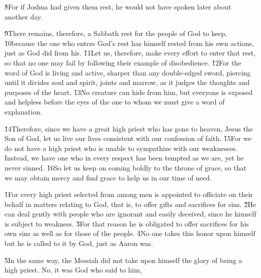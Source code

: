 \v{8}For if Joshua had given them rest, he would not have spoken later about another day.

\v{9}There remains, therefore, a Sabbath rest for the people of God to keep, \v{10}because the one who enters God's rest has himself rested from his own actions, just as God did from his. \v{11}Let us, therefore, make every effort to enter that rest, so that no one may fail by following their example of disobedience. \v{12}For the word of God is living and active, sharper than any double-edged sword, piercing until it divides soul and spirit, joints and marrow, as it judges the thoughts and purposes of the heart. \v{13}No creature can hide from him, but everyone is exposed and helpless before the eyes of the one to whom we must give a word of explanation.

\v{14}Therefore, since we have a great high priest who has gone to heaven, Jesus the Son of God, let us live our lives consistent with our confession of faith. \v{15}For we do not have a high priest who is unable to sympathize with our weaknesses. Instead, we have one who in every respect has been tempted as we are, yet he never sinned. \v{16}So let us keep on coming boldly to the throne of grace, so that we may obtain mercy and find grace to help us in our time of need.

\v{1}For every high priest selected from among men is appointed to officiate on their behalf in matters relating to God, that is, to offer gifts and sacrifices for sins. \v{2}He can deal gently with people who are ignorant and easily deceived, since he himself is subject to weakness. \v{3}For that reason he is obligated to offer sacrifices for his own sins as well as for those of the people. \v{4}No one takes this honor upon himself but he is called to it by God, just as Aaron was.

\v{5}In the same way, the Messiah did not take upon himself the glory of being a high priest. No, it was God who said to him,

